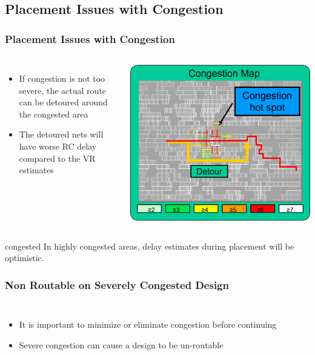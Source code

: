 \documentclass[compress]{beamer}
\begin{document}
\subsection[Issues]{Placement Issues with Congestion}
\begin{frame}
	\frametitle{Placement Issues with Congestion}
	\begin{columns}
			\begin{itemize}
				\item If congestion is not too severe, the actual route can be detoured around the congested area
				\item The detoured nets will have worse RC delay compared to the VR estimates
			\end{itemize}
			\begin{center}
				\includegraphics[width=0.8 \textwidth]{congestion}
			\end{center}
	\end{columns}
	\begin{alertblock}{congested}
	In highly congested areas, delay estimates during placement will be optimistic.
\end{alertblock}
\end{frame}

\begin{frame}
	\frametitle{Non Routable on Severely Congested Design}
		\begin{columns}
		\column{0.6 \textwidth}
		\begin{itemize}
			\item It is important to minimize or eliminate congestion before continuing
			
			\item Severe congestion can cause a design to be un-routable
			
		\end{itemize}
		\column{0.5 \textwidth}
		\begin{center}
		\end{center}
	\end{columns}
\end{frame}
\end{document}
